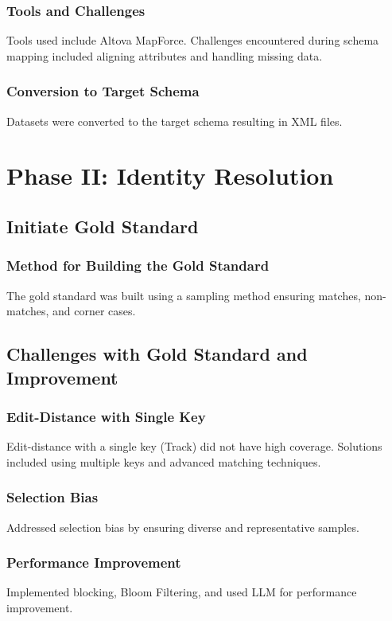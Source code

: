 \documentclass[runningheads]{llncs}
\begin{document}
\subsubsection{Tools and Challenges}
Tools used include Altova MapForce. Challenges encountered during schema mapping included aligning attributes and handling missing data.

\subsubsection{Conversion to Target Schema}
Datasets were converted to the target schema resulting in XML files.

\section{Phase II: Identity Resolution}
\subsection{Initiate Gold Standard}
\subsubsection{Method for Building the Gold Standard}
The gold standard was built using a sampling method ensuring matches, non-matches, and corner cases.

\subsection{Challenges with Gold Standard and Improvement}
\subsubsection{Edit-Distance with Single Key}
Edit-distance with a single key (Track) did not have high coverage. Solutions included using multiple keys and advanced matching techniques.

\subsubsection{Selection Bias}
Addressed selection bias by ensuring diverse and representative samples.

\subsubsection{Performance Improvement}
Implemented blocking, Bloom Filtering, and used LLM for performance improvement.
\end{document}
